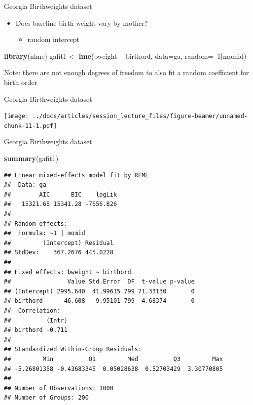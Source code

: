 \documentclass[
  ignorenonframetext,
]{beamer}
\newenvironment{Shaded}{\begin{snugshade}}{\end{snugshade}}
\newcommand{\DataTypeTok}[1]{\textcolor[rgb]{0.13,0.29,0.53}{#1}}
\newcommand{\DecValTok}[1]{\textcolor[rgb]{0.00,0.00,0.81}{#1}}
\newcommand{\KeywordTok}[1]{\textcolor[rgb]{0.13,0.29,0.53}{\textbf{#1}}}
\newcommand{\NormalTok}[1]{#1}
\newcommand{\OperatorTok}[1]{\textcolor[rgb]{0.81,0.36,0.00}{\textbf{#1}}}
\newcommand{\StringTok}[1]{\textcolor[rgb]{0.31,0.60,0.02}{#1}}
\providecommand{\tightlist}{%
  \setlength{\itemsep}{0pt}\setlength{\parskip}{0pt}}
\begin{document}
\begin{frame}[fragile]{Georgia Birthweights dataset}
\protect\hypertarget{georgia-birthweights-dataset-1}{}

\begin{itemize}
\tightlist
\item
  Does baseline birth weight vary by mother?

  \begin{itemize}
  \tightlist
  \item
    random intercept
  \end{itemize}
\end{itemize}

\begin{Shaded}
\begin{Highlighting}[]
\KeywordTok{library}\NormalTok{(nlme)}
\NormalTok{gafit1 <-}\StringTok{ }\KeywordTok{lme}\NormalTok{(bweight }\OperatorTok{~}\StringTok{ }\NormalTok{birthord, }\DataTypeTok{data=}\NormalTok{ga, }\DataTypeTok{random=}\OperatorTok{~}\DecValTok{1}\OperatorTok{|}\NormalTok{momid)}
\end{Highlighting}
\end{Shaded}

Note: there are not enough degrees of freedom to also fit a random
coefficient for birth order

\end{frame}

\begin{frame}{Georgia Birthweights dataset}
\protect\hypertarget{georgia-birthweights-dataset-2}{}

\texttt{[image: ../docs/articles/session\_lecture\_files/figure-beamer/unnamed-chunk-11-1.pdf]}

\end{frame}

\begin{frame}[fragile]{Georgia Birthweights dataset}
\protect\hypertarget{georgia-birthweights-dataset-3}{}

\tiny

\begin{Shaded}
\begin{Highlighting}[]
\KeywordTok{summary}\NormalTok{(gafit1)}
\end{Highlighting}
\end{Shaded}

\begin{verbatim}
## Linear mixed-effects model fit by REML
##  Data: ga 
##        AIC      BIC    logLik
##   15321.65 15341.28 -7656.826
## 
## Random effects:
##  Formula: ~1 | momid
##         (Intercept) Residual
## StdDev:    367.2676 445.0228
## 
## Fixed effects: bweight ~ birthord 
##                Value Std.Error  DF  t-value p-value
## (Intercept) 2995.640  41.99615 799 71.33130       0
## birthord      46.608   9.95101 799  4.68374       0
##  Correlation: 
##          (Intr)
## birthord -0.711
## 
## Standardized Within-Group Residuals:
##         Min          Q1         Med          Q3         Max 
## -5.26801358 -0.43683345  0.05028638  0.52703429  3.30770805 
## 
## Number of Observations: 1000
## Number of Groups: 200
\end{verbatim}

\end{frame}
\end{document}
